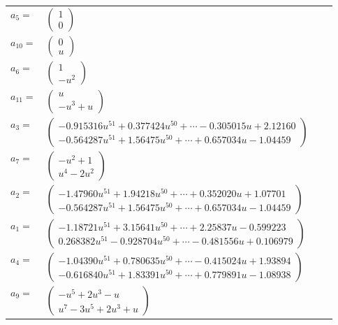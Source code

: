 \documentclass[1p]{elsarticle_modified}
\theoremstyle{definition}
\begin{document}
\begin{tabular}{m{7pt} m{180pt} m{7pt} m{180pt} }
\flushright $a_{5}=$&$\begin{pmatrix}1\\0\end{pmatrix}$ \\
\flushright $a_{10}=$&$\begin{pmatrix}0\\u\end{pmatrix}$ \\
\flushright $a_{6}=$&$\begin{pmatrix}1\\- u^2\end{pmatrix}$ \\
\flushright $a_{11}=$&$\begin{pmatrix}u\\- u^3+u\end{pmatrix}$ \\
\flushright $a_{3}=$&$\begin{pmatrix}-0.915316 u^{51}+0.377424 u^{50}+\cdots-0.305015 u+2.12160\\-0.564287 u^{51}+1.56475 u^{50}+\cdots+0.657034 u-1.04459\end{pmatrix}$ \\
\flushright $a_{7}=$&$\begin{pmatrix}- u^2+1\\u^4-2 u^2\end{pmatrix}$ \\
\flushright $a_{2}=$&$\begin{pmatrix}-1.47960 u^{51}+1.94218 u^{50}+\cdots+0.352020 u+1.07701\\-0.564287 u^{51}+1.56475 u^{50}+\cdots+0.657034 u-1.04459\end{pmatrix}$ \\
\flushright $a_{1}=$&$\begin{pmatrix}-1.18721 u^{51}+3.15641 u^{50}+\cdots+2.25837 u-0.599223\\0.268382 u^{51}-0.928704 u^{50}+\cdots-0.481556 u+0.106979\end{pmatrix}$ \\
\flushright $a_{4}=$&$\begin{pmatrix}-1.04390 u^{51}+0.780635 u^{50}+\cdots-0.415024 u+1.93894\\-0.616840 u^{51}+1.83391 u^{50}+\cdots+0.779891 u-1.08938\end{pmatrix}$ \\
\flushright $a_{9}=$&$\begin{pmatrix}- u^5+2 u^3- u\\u^7-3 u^5+2 u^3+u\end{pmatrix}$ \\

\end{tabular}
\end{document}

